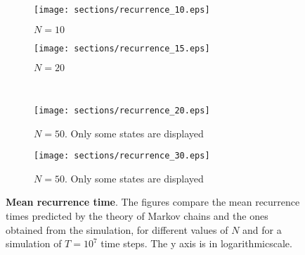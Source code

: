 \begin{figure}
  \begin{subfigure}{.5\textwidth}
      \centering
      \texttt{[image: sections/recurrence\_10.eps]}
      \caption{$N = 10$}
    \end{subfigure}
    \begin{subfigure}{.5\textwidth}
      \centering
      \texttt{[image: sections/recurrence\_15.eps]}
      \caption{$N = 20$}
    \end{subfigure}\\
    \begin{subfigure}{0.5\textwidth}
      \centering
      \texttt{[image: sections/recurrence\_20.eps]}
      \caption{$N = 50$. Only some states are displayed}
    \end{subfigure}%
    \begin{subfigure}{0.5\textwidth}
      \centering
      \texttt{[image: sections/recurrence\_30.eps]}
      \caption{$N = 50$. Only some states are displayed}
    \end{subfigure}%

  \captionsetup{width=.9\linewidth}
  \caption{\textbf{Mean recurrence time}. The figures  compare the mean recurrence times predicted by the theory of Markov chains and the ones obtained from the simulation, for different values of $N$ and for a simulation of $T= 10^7$ time steps. The y axis is in logarithmicscale.}
  \label{fig:recurrence}
\end{figure}



